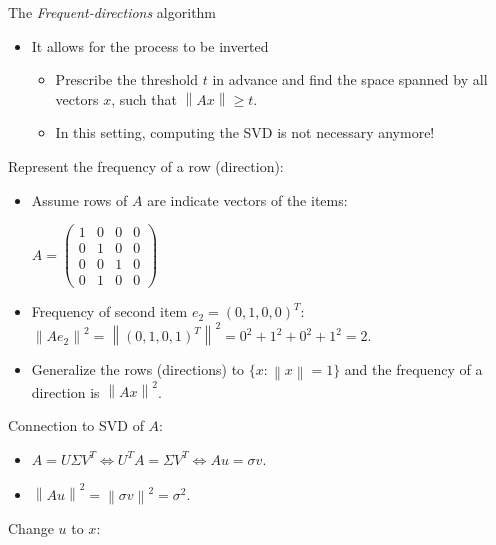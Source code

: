 \documentclass[first=dgreen,second=purple,logo=redque]{aaltoslides}
\newcommand{\vectornorm}[1]{\left\|#1\right\|}
\begin{document}

\begin{frame}[allowframebreaks=1]{The \textit{Frequent-directions} algorithm}
\begin{itemize}
  \item It allows for the process to be inverted
  \begin{itemize}
    \item Prescribe the threshold $t$ in advance and find the space spanned by all
vectors $x$, such that $\vectornorm{Ax} \geq t$.
    \item In this setting, computing the SVD is not necessary anymore!
   \end{itemize}
\end{itemize}

\framebreak
Represent the frequency of a row (direction):
\begin{itemize}
  \item Assume rows of $A$ are indicate vectors of the items: \\
  \begin{center}
  \vspace{2 mm}
  $A = \begin{pmatrix}
       1 & 0 & 0 & 0\\[0.3em] 
       0 & 1 & 0 & 0\\[0.3em]
       0 & 0 & 1 & 0\\[0.3em]
       0 & 1 & 0 & 0
     \end{pmatrix}$
  \end{center}
  \item Frequency of second item $e_2 = (0,1,0,0)^T$:
  $ \vectornorm{Ae_2}^2 = \vectornorm{(0,1,0,1)^T} ^2= 0^2 + 1^2 + 0^2 + 1^2 = 2$. 
  \item Generalize the rows (directions) to $\{x : \vectornorm{x}=1\} $ and the frequency of a direction is $\vectornorm{Ax}^2$.
\end{itemize}

\framebreak
Connection to SVD of $A$:
\begin{itemize}
  \item $A = U\Sigma V^T \Leftrightarrow U^TA = \Sigma V^T \Leftrightarrow Au = \sigma v$.
  \item $\vectornorm{Au}^2 = \vectornorm{\sigma v}^2 = \sigma^2$.
\end{itemize}
  \vspace{2 mm}
Change $u$ to $x$: \\
  \vspace{2 mm}


\end{frame}
\end{document}
